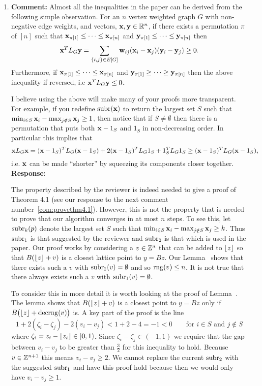 \documentclass[a4paper,10pt]{article}
\begin{document}
\begin{enumerate}
\item\textbf{Comment:} \label{com:uselaplaicesubr1}
Almost all the inequalities in the paper can be derived from the following simple observation.  For an $n$ vertex weighted graph $G$ with non-negative edge weights, and vectors, $\mathbf{x},\mathbf{y} \in {\mathbb R}^n$, if there exists a permutation $\pi$ of $[n]$ such that $\mathbf{x}_{\pi[1]} \leq \dots \leq \mathbf{x}_{\pi[n]}$ and $\mathbf{y}_{\pi[1]} \leq \dots \leq \mathbf{y}_{\pi[n]}$ then
\[
\mathbf{x}^T L_G \mathbf{y} = \sum_{ \{i,j\} \in E[G] } \mathbf{w}_{ij} (\mathbf{x}_{i} - \mathbf{x}_{j}) (\mathbf{y}_{i} - \mathbf{y}_{j}) \geq 0.
\]
Furthermore, if $\mathbf{x}_{\pi[1]} \leq \dots \leq \mathbf{x}_{\pi[n]}$ and $\mathbf{y}_{\pi[1]} \geq \dots \geq \mathbf{y}_{\pi[n]}$ then the above inequality if reversed, i.e $\mathbf{x}^T L_G \mathbf{y} \leq 0$. 

I believe using the above will make many of your proofs more transparent.  For example, if you redefine $\operatorname{subr}(\mathbf{x})$ to return the largest set $S$ such that $\min_{i\in S} \mathbf{x}_i - \max_{j \notin S} \mathbf{x}_j \geq 1$, then notice that if $S \neq \emptyset$ then there is a permutation that puts both $\mathbf{x} - 1_S$ and $1_S$ in non-decreasing order. In particular this implies that
\[
\mathbf{x} L_G \mathbf{x} = (\mathbf{x} - 1_S)^T L_G (\mathbf{x} - 1_S) + 2(\mathbf{x} - 1_S)^T L_G 1_S + 1_S^T L_G 1_S \geq (\mathbf{x} - 1_S)^T L_G (\mathbf{x} - 1_S),
\]
i.e. $\mathbf{x}$ can be made ``shorter'' by squeezing its components closer together.
\\\textbf{Response:}

The property described by the reviewer is indeed needed to give a proof of Theorem 4.1 (see our response to the next comment number~\ref{com:provethm4.1}).  However, this is not the property that is needed to prove that our algorithm converges in at most $n$ steps.  To see this, let $\operatorname{subr}_k(p)$ denote the largest set $S$ such that $\min_{i\in S} \mathbf{x}_i - \max_{j \notin S} \mathbf{x}_j \geq k$. Thus $\operatorname{subr}_1$ is that suggested by the reviewer and $\operatorname{subr}_2$ is that which is used in the paper.  Our proof works by considering a $v \in {\mathbb Z}^n$ that can be added to ${\left\lfloor z \right\rfloor}$ so that $B({\left\lfloor z \right\rfloor} + v)$ is a closest lattice point to $y = Bz$.  Our Lemma~ shows that there exists such a $v$ with $\operatorname{subr}_2(v) = \emptyset$ and so $\operatorname{rng}(v) \leq n$.  It is not true that there always exists such a $v$ with  $\operatorname{subr}_1(v) = \emptyset$.

To consider this in more detail it is worth looking at the proof of Lemma~.  The lemma shows that $B({\left\lfloor z \right\rfloor} + v)$ is a closest point to $y = Bz$ only if $B\big({\left\lfloor z \right\rfloor} + \operatorname{decrng}(v)\big)$ is.  A key part of the proof is the line
\[
1 + 2(\zeta_i-\zeta_j) - 2(v_i - v_j) < 1 + 2 - 4 = -1 < 0 \qquad \text{for $i \in S$ and $j \notin S$}
\]
where $\zeta_i = z_i - {\left\lfloor z_i \right\rfloor} \in [0,1)$.  Since $\zeta_i-\zeta_j \in (-1,1)$ we require that the gap between $v_i - v_j$ to be greater than $\tfrac{3}{2}$ for this inequality to hold.  Because $v \in {\mathbb Z}^{n+1}$ this means $v_i - v_j \geq 2$.  We cannot replace the current $\operatorname{subr}_2$ with the suggested $\operatorname{subr}_1$ and have this proof hold because then we would only have $v_i - v_j \geq 1$.


\end{enumerate}
\end{document}
